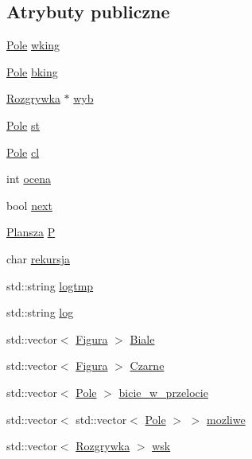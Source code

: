 \subsection*{\-Atrybuty publiczne}
\begin{DoxyCompactItemize}
\item 
\hyperlink{class_pole}{\-Pole} \hyperlink{class_rozgrywka_a35556003d852bbed7adfb165a27232f4}{wking}
\item 
\hyperlink{class_pole}{\-Pole} \hyperlink{class_rozgrywka_a5d791226219e1d9f6b4d7b4a321a217c}{bking}
\item 
\hyperlink{class_rozgrywka}{\-Rozgrywka} $\ast$ \hyperlink{class_rozgrywka_a16162d348a75ac115dbf92f4bd7c4a32}{wyb}
\item 
\hyperlink{class_pole}{\-Pole} \hyperlink{class_rozgrywka_ac8e44798bc9896c1bd56f4b07eee07b4}{st}
\item 
\hyperlink{class_pole}{\-Pole} \hyperlink{class_rozgrywka_ae5873496f515f96320fa604d23708966}{cl}
\item 
int \hyperlink{class_rozgrywka_a066b0f6ea58752342f0b4bf94a2e54ce}{ocena}
\item 
bool \hyperlink{class_rozgrywka_a792971709bdb3b8e29b081e7bcf18cc9}{next}
\item 
\hyperlink{class_plansza}{\-Plansza} \hyperlink{class_rozgrywka_aeae1debddab56c1028014402f97eebda}{\-P}
\item 
char \hyperlink{class_rozgrywka_ab8da8c6df7b1a4673e79af7f09e90f5c}{rekursja}
\item 
std\-::string \hyperlink{class_rozgrywka_a2b399aa340778eab619f889c7efed08d}{logtmp}
\item 
std\-::string \hyperlink{class_rozgrywka_a5ab94cafc14381b9f8da8a1ddb428f55}{log}
\item 
std\-::vector$<$ \hyperlink{class_figura}{\-Figura} $>$ \hyperlink{class_rozgrywka_a7656a966f40560f3b8850cfcbc6d73d7}{\-Biale}
\item 
std\-::vector$<$ \hyperlink{class_figura}{\-Figura} $>$ \hyperlink{class_rozgrywka_a36ee2fc7f160a08fd58afd0b8c5c297f}{\-Czarne}
\item 
std\-::vector$<$ \hyperlink{class_pole}{\-Pole} $>$ \hyperlink{class_rozgrywka_ac57c5275261e3c1091c6ff0c5dff1bb4}{bicie\-\_\-w\-\_\-przelocie}
\item 
std\-::vector$<$ std\-::vector$<$ \hyperlink{class_pole}{\-Pole} $>$ $>$ \hyperlink{class_rozgrywka_a54acd39dc475453661bcf7b8c51b5047}{mozliwe}
\item 
std\-::vector$<$ \hyperlink{class_rozgrywka}{\-Rozgrywka} $>$ \hyperlink{class_rozgrywka_a5517c4100004d16c73be0f50a90fa193}{wsk}
\end{DoxyCompactItemize}
